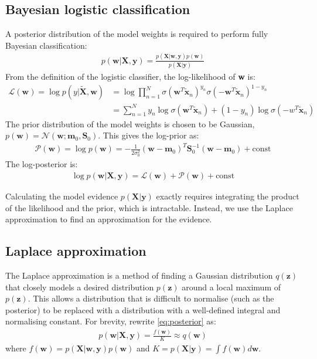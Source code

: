 \documentclass[a4paper]{article}
\begin{document}
    \subsection{Bayesian logistic classification}
    A posterior distribution of the model weights is required to perform fully Bayesian classification:
    \begin{align}
        p(\bm{w} | \bm{X}, \bm{y}) = \frac{p(\bm{X} | \bm{w}, \bm{y}) p(\bm w)}{p(\bm{X} | \bm{y})}
        \label{eq:posterior}
    \end{align}
    From the definition of the logistic classifier, the log-likelihood of \textbf{w} is:
    \begin{align}
        \mathcal{L}(\bm{w}) = \log p(y|\tilde{\bm{X}}, \bm{w})
        &= \log \prod_{n=1}^{N} \sigma( \bm{w}^T \tilde{\bm{x}}_n)^{y_n}
        \sigma (-\bm{w}^T \tilde{\bm{x}}_n)^{1-y_n} \nonumber \\
        &= \sum_{n=1}^{N} y_n \log\sigma( \bm{w}^T \tilde{\bm{x}}_n) + (1-y_n) \log\sigma(-w^T \tilde{\bm{x}}_n)
        \label{eq:log-likelihood}
    \end{align}
    The prior distribution of the model weights is chosen to be Gaussian, $p(\bm{w}) = \mathcal{N}(\bm{w}; \bm{m}_0, \bm{S}_0)$.
    This gives the log-prior as:
    \begin{align}
        \mathcal{P}(\bm{w}) = \log p(\bm{w}) = -\frac{1}{2\sigma_0^2}(\bm{w} - \bm{m}_0)^T \bm{S}_0^{-1} (\bm{w} - \bm{m}_0) + \text{const}
        \label{eq:log-prior}
    \end{align}
    The log-posterior is:
    \begin{align}
        \log p(\bm{w} | \bm{X}, \bm{y}) = \mathcal{L}(\bm{w}) + \mathcal{P}(\bm{w}) + \text{const}
        \label{eq:log_posterior}
    \end{align}

    Calculating the model evidence $p(\bm{X} | \bm{y})$ exactly requires integrating the product of the likelihood and the prior, which is intractable. Instead, we use the Laplace approximation to find an approximation for the evidence.
    
    \subsection{Laplace approximation}
    The Laplace approximation is a method of finding a Gaussian distribution $q(\bm{z})$ that closely models a desired distribution $p(\bm{z})$ around a local maximum of $p(\bm{z})$.
    This allows a distribution that is difficult to normalise (such as the posterior) to be replaced with a distribution with a well-defined integral and normalising constant.
    For brevity, rewrite \autoref{eq:posterior} as:
    \begin{align}
        p(\bm{w} | \bm{X}, \bm{y}) = \frac{f(\bm{w})}{K} \approx q(\bm{w})
    \end{align}
    where $f(\bm{w}) = p(\bm{X} | \bm{w}, \bm{y}) p(\bm w)$ and $K = p(\bm{X} | \bm{y}) = \int f(\bm{w}) d\bm{w}$.
\end{document}

